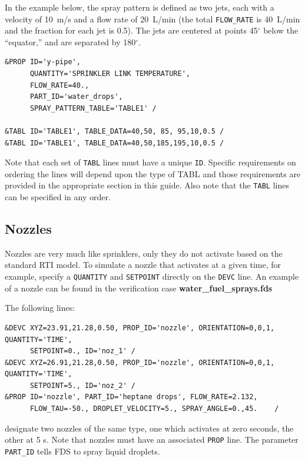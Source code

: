 \documentclass[11pt]{book}
\newcommand{\ct}{\tt\small}
\begin{document}
In the example below, the spray pattern is defined as two jets, each with a velocity of 10~m/s and a flow rate
of 20~L/min (the total {\ct FLOW\_RATE} is 40~L/min and the fraction for each jet is 0.5). The jets are centered at points 45$^\circ$ below the ``equator,'' and are separated
by 180$^\circ$.

\footnotesize
\begin{verbatim}
&PROP ID='y-pipe',
      QUANTITY='SPRINKLER LINK TEMPERATURE',
      FLOW_RATE=40.,
      PART_ID='water_drops',
      SPRAY_PATTERN_TABLE='TABLE1' /

&TABL ID='TABLE1', TABLE_DATA=40,50, 85, 95,10,0.5 /
&TABL ID='TABLE1', TABLE_DATA=40,50,185,195,10,0.5 /
\end{verbatim}
\normalsize

\begin{warning}
\noindent
Note that each set of {\ct TABL} lines must have a unique {\ct ID}.  Specific requirements on ordering the lines
will depend upon the type of TABL and those requirements are provided in the appropriate section in this guide. Also note that
the {\ct TABL} lines can be specified in any order.
\end{warning}





\subsection{Nozzles}
\label{info:nozzles}

Nozzles are very much like sprinklers, only they do not activate based on the standard RTI model.
To simulate a nozzle that activates at a given time, for example,
specify a {\ct QUANTITY} and {\ct SETPOINT} directly on the {\ct DEVC} line.
An example of a nozzle can be found in the verification case {\bf water\_fuel\_sprays.fds}

The following lines:
\footnotesize
\begin{verbatim}
&DEVC XYZ=23.91,21.28,0.50, PROP_ID='nozzle', ORIENTATION=0,0,1, QUANTITY='TIME',
      SETPOINT=0., ID='noz_1' /
&DEVC XYZ=26.91,21.28,0.50, PROP_ID='nozzle', ORIENTATION=0,0,1, QUANTITY='TIME',
      SETPOINT=5., ID='noz_2' /
&PROP ID='nozzle', PART_ID='heptane drops', FLOW_RATE=2.132,
      FLOW_TAU=-50., DROPLET_VELOCITY=5., SPRAY_ANGLE=0.,45.    /
\end{verbatim}
\normalsize

\noindent
designate two nozzles of the same type, one which activates at zero seconds, the other at 5 s. Note that nozzles must have an
associated {\ct PROP} line. The parameter {\ct PART\_ID} tells FDS to spray liquid droplets.
\end{document}
